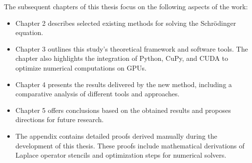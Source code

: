 The subsequent chapters of this thesis focus on the following aspects of the work:
\begin{itemize}[itemsep=0\baselineskip, topsep=1.5pt, parsep=1.5pt] 
	\item Chapter 2 describes selected existing methods for solving the Schrödinger equation.
	\item Chapter 3 outlines this study's theoretical framework and software tools. The chapter also highlights the integration of Python, CuPy, and CUDA to optimize numerical computations on GPUs.
	\item Chapter 4 presents the results delivered by the new method, including a comparative analysis of different tools and approaches.
	\item Chapter 5 offers conclusions based on the obtained results and proposes directions for future research.  
	\item The appendix contains detailed proofs derived manually during the development of this thesis. These proofs include mathematical derivations of Laplace operator stencils and optimization steps for numerical solvers.
\end{itemize}

